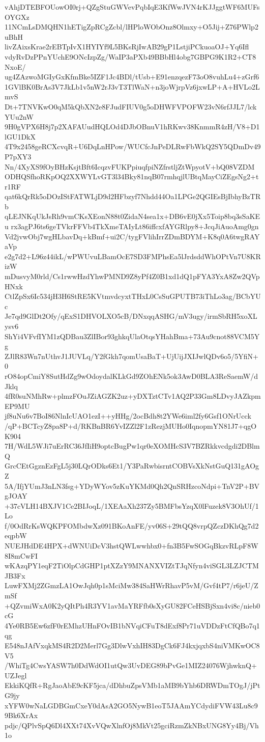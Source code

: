 vAhjDTEBFOUowOI0rj+QZgStuGWVevPqbIqE3KfWwJVN4rKJJggtWF6MUFsOYGXz
11NCmLsDMQHN1hETigZpRCgZcbl/lHPloWObOnz8Olmxy+O5Jij+Z76PWlp2uBhH
livZAixsKrae2rEBTpIvX1HYIYf9L5BKsRjIwAB29gP1LstjiPCkuoaOJ+Yq6Ifl
vdyRvDzPPnYUchE9ONcIzpZg/WaIP3aPXb49BBbHl4obg7GBPG9K1R2+CT8NxoE/
ug4ZAzwoMGIyGxKfmBke5IZF1Jc4BDl/tUsb+E91enzqezF73oO8vuhLu4+zGrf6
1GVlBK0BrAs3V7JkLb1v5nW2rJ3vT3TlWaN+n3joWjrpVz6jxwLP+A+HVLo2LmvS
Dt+7TNVKwO0qM5kQbXN2e8FJudFIUV0g5oDHWFVPOFW23vN6rfJJL7/lckYUu2nW
9H0gVPX6H8j7p2XAFAUudHQLOd4DJbOBnuV1hRKwv38KnmmR4zH/V8+D1lGU1DkX
4T9x2458geRCXcvqR+U6DqLnHPow/WUCfcJnPeDLRwFbWkQ2SY5QDmDv49P7pXY3
Nn/4XyXS9fOyBHzKsjtBft6IcqzvFUKPpiuqfpiNZfrstljZtWpyotV+bQ08VZDM
ODHQSfhoRKpOQ2XXWYLvGT3l34Bky81nqB07rmhqjlUBtqMayCiZEgsNg2+tr1RF
qat6kQrRk5oDOzIStFATWLjD9d2HFbzyf7Nhdd44Oa1LPGe2QGIEsBjIbhyBzTRb
qLEJNKqUkJsRh9vmCKsXEonN88t0ZidaN4sea1x+DB6vE0jXx5Toip8bq3sSaKEu
rx3agPJ6ts6geTVkrFFVb4TkXmeTAIyLt86iffcxfAYGRlpy8+JcqJiAuoAmg0gn
Vd2jvwObj7wgHLbavDq+kBmf+ui2C/tygFVlihIrrZDmBDYM+K8q0A6twgRAYaVp
e2g7d2+L96z44ikL/wPWUvuLBamOcE7SD3FMPhsEa5lJrdsddWhOPtVn7U8KRizW
mDusvyM0rld/Cs1rwwHzdYhwPMND9Z8yPf4Z0B1xd1dQ1pFYA3YxA8Zw2QVpHNxk
CtlZpSx6Ic534jH3H6StRE5KVtmvdcyxtTHxL0CsSuGPUTB73iThLo3ag/BCbYUc
Je7qd9GlDt2Ofy/qExS1DHVOLXO5cB/DNxqqASHG/mV3ugy/irmSbRH5xoXLysv6
ShYi4VFvfIYM1zQDBau3ZlIBor93ghkqUlaOtqsYHahBma+73Au9cnot88VCM5Yg
ZJlR83Wn7nUthvJ1JUVLq/Y2fGkh7qomUsaBaT+UjUijJXIJwlQDv6o5/5YfiN+0
rO84opCmiY8SutHdZg9wOdoydalKLkGd9ZOhENk5ok3AwD0BLA3ReSaemW/dJklq
4fR0suNMhRw+plmzFOuJZiAGZK2uz+yDXTztCTv1AQ2P33Gm8LDvyJAZkpmEP9MU
jf8uNu6v7BoI86NlnIcUAO1ezI++yHHg/2ocBdh8t2YWe6iml2fy6Gsf1ONrUcck
/qP+BCTcyZ8pa8P+d/RKBnBR6YvIZZl2F1zRezjMUHo0IqnopmYN81J7+qgOK904
7H/WdL5WJi7uErRC36JfIiH9optcBugPw1qr0eXOMHcS3V7BZRkkvcdgdi2DBlmQ
GrcCEtGgznEzFgL5j30LQrODks6Et1/Y3PaRwbisrntCOBVsXkNstGuQ131gAOgZ
5A/IfjYUmJ3nLN3fsg+YDyWYov5zKuYKMd0Qh2QnSRHzcoNdpi+TnV2P+BVgJOAY
+37cVLH14BXJV1Ce2BIJoqL/1XEAaXh237Zy5BMFbsYzqX0lFuzek8V3OhUf/1Lo
f/0OdRrKsWQKPFOMbdwXz091BKoAnFE/yv06S+29tQQ8vrpQZczDKhQg7d2eqpbW
NUEJHdDE4HPX+dWNUiDcV3hstQWLwwhbx0+fn3B5FwSOGqBkzvRLpF8W8I8mCwFI
wKAzqPY1eqF2TiOlpCdGHP1ptXZzY9MNANXVIZtTJqNfyn4viSGL3LZJCTMJB3Fx
LuwFXMj2ZGmzLA1OwJqh0p1sMciMw384SaHWrRhavP5vM/Gvf4tP7/r6jeU/ZmSf
+QZvmiWxA0K2yQItPh4R3YV1avMaYRFfb0sXyGU82FCeHSBjSxn4vi8c/nieb0cG
4Ye0RB5Ew6zfF0rEMhzUHnFOvIB1bNVqiCFuT8dExf8Pr71uVDDzFtCfQBo7q1qg
E548nJAfVxqkMS4R2D2Merl7Gg3DlwVxhIH83DgCk6FJ4kxjqxbS4niVMKwOC8V5
/WhiTg4CwsYASW7h0DdWdOI1utQw3UvDEG89bPvGe1MIZ24076WjhwknQ+UZJegl
EkkiKQfR+RgJaoAbE9cKF5jca/dDhbuZpsVMb1aMB9bYhb6DRWDmTOgJ/jPtG9jy
xYFW0wNaLGDBGmCxeY0dAsA2GO5NywB1eoT5JAAmYCdydiFVW43Lu8c99Bk6XrAx
pdjc/QPlvSpQ6Dl4XXt74XvVQwXlnfOj8MkVt25gciRzmZkNBxUNG8Yy4Bj/Vh1o
